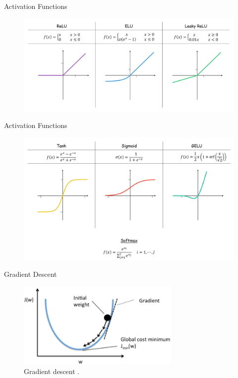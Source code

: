 \begin{frame}{Activation Functions}
	\begin{figure}[H]
		\centering
		\includegraphics[width=1\textwidth]{Figs/section_1/activation_functions_1.PNG}
	\end{figure}
\end{frame}

\begin{frame}{Activation Functions}
	\begin{figure}[H]
		\centering
		\includegraphics[width=1\textwidth]{Figs/section_1/activation_functions_2.PNG}
	\end{figure}
\end{frame}

\begin{frame}{Gradient Descent}
	\begin{figure}[H]
		\centering
		\includegraphics[width=0.70\textwidth]{Figs/gradient_descent2.png}
		\caption{Gradient descent \cite{gradient-descend2}.}
	\end{figure}
\end{frame}

